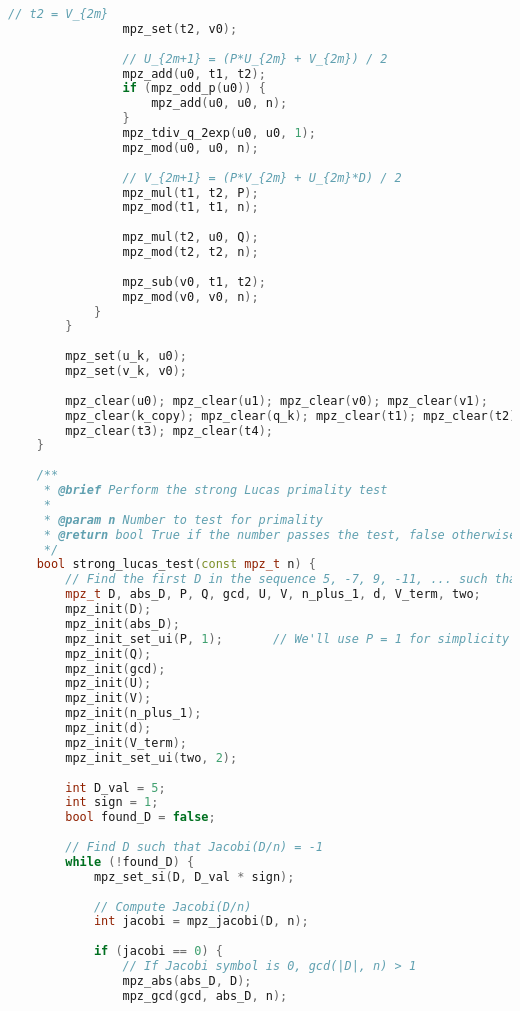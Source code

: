 \begin{lstlisting}[language=C++, caption=Baillie-PSW Test Implementation]
                // t2 = V_{2m}
                mpz_set(t2, v0);
                
                // U_{2m+1} = (P*U_{2m} + V_{2m}) / 2
                mpz_add(u0, t1, t2);
                if (mpz_odd_p(u0)) {
                    mpz_add(u0, u0, n);
                }
                mpz_tdiv_q_2exp(u0, u0, 1);
                mpz_mod(u0, u0, n);
                
                // V_{2m+1} = (P*V_{2m} + U_{2m}*D) / 2
                mpz_mul(t1, t2, P);
                mpz_mod(t1, t1, n);
                
                mpz_mul(t2, u0, Q);
                mpz_mod(t2, t2, n);
                
                mpz_sub(v0, t1, t2);
                mpz_mod(v0, v0, n);
            }
        }
        
        mpz_set(u_k, u0);
        mpz_set(v_k, v0);
        
        mpz_clear(u0); mpz_clear(u1); mpz_clear(v0); mpz_clear(v1);
        mpz_clear(k_copy); mpz_clear(q_k); mpz_clear(t1); mpz_clear(t2);
        mpz_clear(t3); mpz_clear(t4);
    }
    
    /**
     * @brief Perform the strong Lucas primality test
     * 
     * @param n Number to test for primality
     * @return bool True if the number passes the test, false otherwise
     */
    bool strong_lucas_test(const mpz_t n) {
        // Find the first D in the sequence 5, -7, 9, -11, ... such that Jacobi(D/n) = -1
        mpz_t D, abs_D, P, Q, gcd, U, V, n_plus_1, d, V_term, two;
        mpz_init(D);
        mpz_init(abs_D);
        mpz_init_set_ui(P, 1);       // We'll use P = 1 for simplicity
        mpz_init(Q);
        mpz_init(gcd);
        mpz_init(U);
        mpz_init(V);
        mpz_init(n_plus_1);
        mpz_init(d);
        mpz_init(V_term);
        mpz_init_set_ui(two, 2);
        
        int D_val = 5;
        int sign = 1;
        bool found_D = false;
        
        // Find D such that Jacobi(D/n) = -1
        while (!found_D) {
            mpz_set_si(D, D_val * sign);
            
            // Compute Jacobi(D/n)
            int jacobi = mpz_jacobi(D, n);
            
            if (jacobi == 0) {
                // If Jacobi symbol is 0, gcd(|D|, n) > 1
                mpz_abs(abs_D, D);
                mpz_gcd(gcd, abs_D, n);
                

\end{lstlisting}
